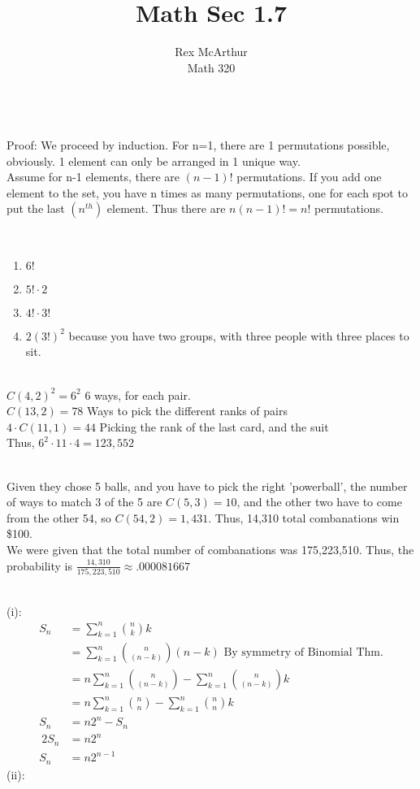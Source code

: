 \documentclass[letterpaper,12pt]{article}
\title{Math Sec 1.7}
\author{Rex McArthur\\Math 320}
\theoremstyle{definition}
\begin{document}
\maketitle
{}\\
Proof: We proceed by induction. For n=1, there are 1 permutations possible, 
obviously. 1 element can only be arranged in 1 unique way.\\
Assume for n-1 elements, there are $(n-1)!$ permutations. If you add one
element to the set, you have n times as many permutations, one for each 
spot to put the last $(n^{th})$ element. Thus there are $n(n-1)! = n!$ 
permutations.

\\
\begin{enumerate}
    \item $6!$
    \item $5!\cdot2$
    \item $4!\cdot3!$
    \item $2(3!)^2$ because you have two groups, with three people with 
        three places to sit.
\end{enumerate}

\\
$C(4,2)^2 = 6^2$ 6 ways, for each pair. \\
$C(13,2) = 78$ Ways to pick the different ranks of pairs\\
$4 \cdot C(11,1) = 44$ Picking the rank of the last card, and the suit\\
Thus, $6^2\cdot 11\cdot 4 = 123,552$

\\
Given they chose 5 balls, and you have to pick the right 'powerball', 
the number of ways to match 3 of the 5 are $C(5,3) = 10$, 
and the other two have to come from the other 54, so $C(54,2) = 1,431$. 
Thus, 14,310 total combanations win \$100. \\
We were given that the total number of combanations was 175,223,510. Thus,
the probability is $\frac{14,310}{175,223,510} \approx .000081667$

\\
(i):
\begin{align*}
    S_n & = \sum^n _{k=1} \binom nk k \\
    & =  \sum^n _{k=1} \binom n {(n-k)} (n-k) \text{    
        By symmetry of Binomial Thm.}\\
    & =  n\sum^n _{k=1} \binom n {(n-k)} - \sum^n _{k=1} \binom n {(n-k)} k \\
    & =  n\sum^n _{k=1} \binom n {n} - \sum^n _{k=1} \binom n {n} k \\
    S_n & = n2^n - S_n \\
    ~2 S_n & = n2^n \\
    S_n & = n2^{n-1}
\end{align*}
(ii):

\\
\end{document}
